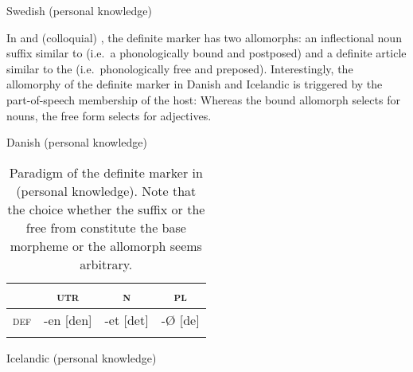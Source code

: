 {%
\begin{exe}
\ex \rm{Swedish (personal knowledge)}
\begin{xlist}
\end{xlist}
\end{exe}
In  and (colloquial) , the definite marker has two allomorphs: an inflectional noun suffix similar to  (i.e.~a phonologically bound and postposed) and a definite article similar to the  (i.e.~phonologically free and preposed). Interestingly, the allomorphy of the definite marker in Danish and Icelandic is triggered by the part-of-speech membership of the host: Whereas the bound allomorph selects for nouns, the free form selects for adjectives.
\begin{exe}
\ex \rm{Danish (personal knowledge)}
\begin{xlist}
\end{xlist}
\end{exe}
\begin{table}
\begin{tabular}{l | ccc}
\lsptoprule
			&\textsc{utr}	&\textsc{n}		&\textsc{pl}\\
\midrule
\textsc{def}	&-en [den]		&-et [det]			&-{Ø} [de]\\
\lspbottomrule
\end{tabular}
\caption[Paradigm of \textsc{def} in Danish]{Paradigm of the definite marker in  (personal knowledge). Note that the choice whether the suffix or the free from constitute the base morpheme or the allomorph seems arbitrary.}
\label{danish defallomorph}
\end{table}
\begin{exe}
\ex \rm{Icelandic (personal knowledge)}
\begin{xlist}
\end{xlist}
\end{exe}

}
